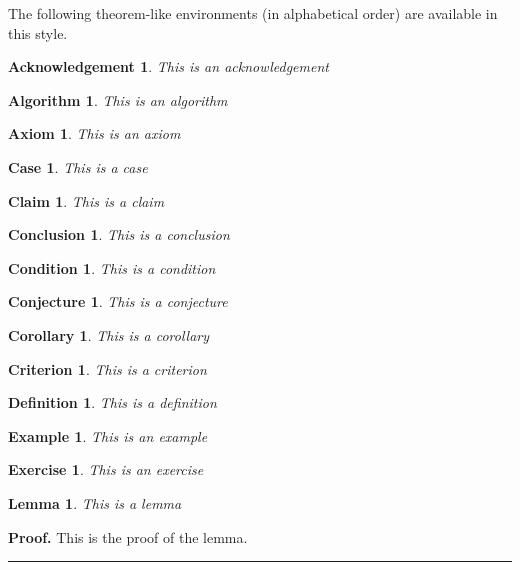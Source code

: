 \documentclass[letterpaper,12pt,openany,reqno]{book}%
\newtheorem{acknowledgement}[theorem]{Acknowledgement}
\newtheorem{algorithm}[theorem]{Algorithm}
\newtheorem{axiom}[theorem]{Axiom}
\newtheorem{case}[theorem]{Case}
\newtheorem{claim}[theorem]{Claim}
\newtheorem{conclusion}[theorem]{Conclusion}
\newtheorem{condition}[theorem]{Condition}
\newtheorem{conjecture}[theorem]{Conjecture}
\newtheorem{corollary}[theorem]{Corollary}
\newtheorem{criterion}[theorem]{Criterion}
\newtheorem{definition}[theorem]{Definition}
\newtheorem{example}[theorem]{Example}
\newtheorem{exercise}[theorem]{Exercise}
\newtheorem{lemma}[theorem]{Lemma}
\newenvironment{proof}[1][Proof]{\textbf{#1.} }{\ \rule{0.5em}{0.5em}}
\begin{document}
The following theorem-like environments (in alphabetical order) are available
in this style.

\begin{acknowledgement}
This is an acknowledgement
\end{acknowledgement}

\begin{algorithm}
This is an algorithm
\end{algorithm}

\begin{axiom}
This is an axiom
\end{axiom}

\begin{case}
This is a case
\end{case}

\begin{claim}
This is a claim
\end{claim}

\begin{conclusion}
This is a conclusion
\end{conclusion}

\begin{condition}
This is a condition
\end{condition}

\begin{conjecture}
This is a conjecture
\end{conjecture}

\begin{corollary}
This is a corollary
\end{corollary}

\begin{criterion}
This is a criterion
\end{criterion}

\begin{definition}
This is a definition
\end{definition}

\begin{example}
This is an example
\end{example}

\begin{exercise}
This is an exercise
\end{exercise}

\begin{lemma}
This is a lemma
\end{lemma}

\begin{proof}
This is the proof of the lemma.
\end{proof}
\end{document}
